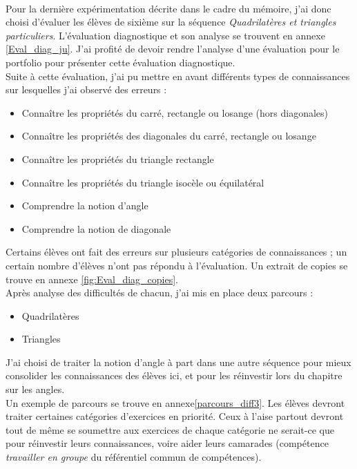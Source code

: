\paragraph{} Pour la dernière expérimentation décrite dans le cadre du mémoire, j'ai donc choisi d'évaluer les élèves de sixième sur la séquence \textit{Quadrilatères et triangles particuliers}. L'évaluation diagnostique et son analyse se trouvent en annexe \ref{Eval_diag_ju}. J'ai profité de devoir rendre l'analyse d'une évaluation pour le portfolio pour présenter cette évaluation diagnostique.\\
Suite à cette évaluation, j'ai pu mettre en avant différents types de connaissances sur lesquelles j'ai observé des erreurs :
\begin{itemize}
	\item Connaître les propriétés du carré, rectangle ou losange (hors diagonales)
	\item Connaître les propriétés des diagonales du carré, rectangle ou losange
	\item Connaître les propriétés du triangle rectangle
	\item Connaître les propriétés du triangle isocèle ou équilatéral
	\item Comprendre la notion d'angle
	\item Comprendre la notion de diagonale
\end{itemize}
Certains élèves ont fait des erreurs sur plusieurs catégories de connaissances ; un certain nombre d'élèves n'ont pas répondu à l'évaluation. Un extrait de copies se trouve en annexe \ref{fig:Eval_diag_copies}.\\
Après analyse des difficultés de chacun, j'ai mis en place deux parcours :
\begin{itemize}
\item Quadrilatères
\item Triangles
\end{itemize}
J'ai choisi de traiter la notion d'angle à part dans une autre séquence pour mieux consolider les connaissances des élèves ici, et pour les réinvestir lors du chapitre sur les angles.\\
Un exemple de parcours se trouve en annexe\ref{parcours_diff3}. Les élèves devront traiter certaines catégories d'exercices en priorité.
Ceux à l'aise partout devront tout de même se soumettre aux exercices de chaque catégorie ne serait-ce que pour réinvestir leurs connaissances, voire aider leurs camarades (compétence \textit{travailler en groupe} du référentiel commun de compétences).\\
